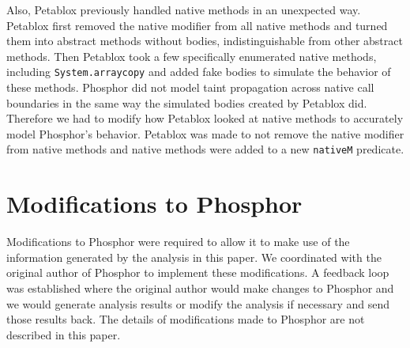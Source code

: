 Also, Petablox previously handled native methods in an unexpected way. Petablox first removed the native modifier from all native methods and turned them into abstract methods without bodies, indistinguishable from other abstract methods. Then Petablox took a few specifically enumerated native methods, including \texttt{System.arraycopy} and added fake bodies to simulate the behavior of these methods. Phosphor did not model taint propagation across native call boundaries in the same way the simulated bodies created by Petablox did. Therefore we had to modify how Petablox looked at native methods to accurately model Phosphor's behavior. Petablox was made to not remove the native modifier from native methods and native methods were added to a new \texttt{nativeM} predicate. 
\section{Modifications to Phosphor}
Modifications to Phosphor were required to allow it to make use of the information generated by the analysis in this paper. We coordinated with the original author of Phosphor to implement these modifications. A feedback loop was established where the original author would make changes to Phosphor and we would generate analysis results or modify the analysis if necessary and send those results back. The details of modifications made to Phosphor are not described in this paper.
